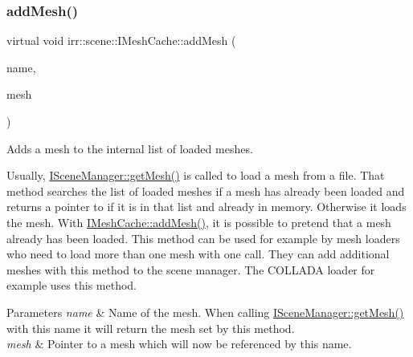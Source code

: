 \subsubsection{\texorpdfstring{add\+Mesh()}{addMesh()}\hspace{0.1cm}{\footnotesize\ttfamily [2/2]}}
{\footnotesize\ttfamily virtual void irr\+::scene\+::\+I\+Mesh\+Cache\+::add\+Mesh (\begin{DoxyParamCaption}\item[{const \hyperlink{namespaceirr_1_1io_a6468281622ce3a1c46b72e19f32dded5}{io\+::path} \&}]{name,  }\item[{\hyperlink{classirr_1_1scene_1_1IAnimatedMesh}{I\+Animated\+Mesh} $\ast$}]{mesh }\end{DoxyParamCaption})\hspace{0.3cm}{\ttfamily [pure virtual]}}



Adds a mesh to the internal list of loaded meshes. 

Usually, \hyperlink{classirr_1_1scene_1_1ISceneManager_a63894c3f3d46cfc385116f1705935e03}{I\+Scene\+Manager\+::get\+Mesh()} is called to load a mesh from a file. That method searches the list of loaded meshes if a mesh has already been loaded and returns a pointer to if it is in that list and already in memory. Otherwise it loads the mesh. With \hyperlink{classirr_1_1scene_1_1IMeshCache_a2959812a3a393817b1db42761766c49b}{I\+Mesh\+Cache\+::add\+Mesh()}, it is possible to pretend that a mesh already has been loaded. This method can be used for example by mesh loaders who need to load more than one mesh with one call. They can add additional meshes with this method to the scene manager. The C\+O\+L\+L\+A\+DA loader for example uses this method. 
\begin{DoxyParams}{Parameters}
{\em name} & Name of the mesh. When calling \hyperlink{classirr_1_1scene_1_1ISceneManager_a63894c3f3d46cfc385116f1705935e03}{I\+Scene\+Manager\+::get\+Mesh()} with this name it will return the mesh set by this method. \\
\hline
{\em mesh} & Pointer to a mesh which will now be referenced by this name. \\
\hline
\end{DoxyParams}
\mbox{\label{classirr_1_1scene_1_1IMeshCache_ad92d924e558c3a7504f9154ee29b1569}} 
